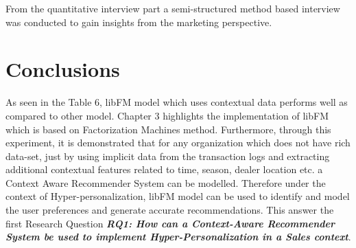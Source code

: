 From the quantitative interview part a semi-structured method based interview was conducted to gain insights from the marketing perspective.




\section{Conclusions}

As seen in the Table 6, libFM model which uses contextual data performs well as compared to other model. Chapter 3 highlights the implementation of libFM which is based on Factorization Machines method. Furthermore, through this experiment, it is demonstrated that for any organization which does not have rich data-set, just by using implicit data from the transaction logs and extracting additional contextual features related to time, season, dealer location etc. a Context Aware Recommender System can be modelled. Therefore under the context of Hyper-personalization, libFM model can be used to identify and model the user preferences and generate accurate recommendations. This answer the first Research Question \textbf{\textit{RQ1: How can a Context-Aware Recommender System be used to implement Hyper-Personalization in a Sales context}}. \\ 

